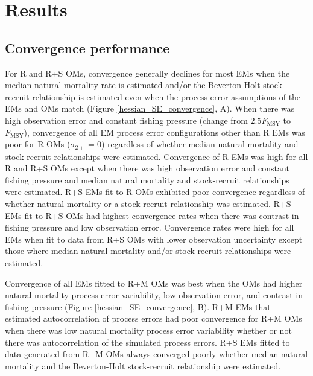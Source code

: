 \documentclass[
  12pt,
]{article}
\begin{document}
\hypertarget{results}{%
\section*{Results}\label{results}}

\hypertarget{convergence-performance}{%
\subsection*{Convergence performance}\label{convergence-performance}}

For R and R+S OMs, convergence generally declines for most EMs when the
median natural mortality rate is estimated and/or the Beverton-Holt
stock recruit relationship is estimated even when the process error
assumptions of the EMs and OMs match (Figure
\ref{hessian_SE_convergence}, A). When there was high observation error
and constant fishing pressure (change from \(2.5F_{\text{MSY}}\) to
\(F_{\text{MSY}}\)), convergence of all EM process error configurations
other than R EMs was poor for R OMs (\(\sigma_{2+} = 0\)) regardless of
whether median natural mortality and stock-recruit relationships were
estimated. Convergence of R EMs was high for all R and R+S OMs except
when there was high observation error and constant fishing pressure and
median natural mortality and stock-recruit relationships were estimated.
R+S EMs fit to R OMs exhibited poor convergence regardless of whether
natural mortality or a stock-recruit relationship was estimated. R+S EMs
fit to R+S OMs had highest convergence rates when there was contrast in
fishing pressure and low observation error. Convergence rates were high
for all EMs when fit to data from R+S OMs with lower observation
uncertainty except those where median natural mortality and/or
stock-recruit relationships were estimated.

Convergence of all EMs fitted to R+M OMs was best when the OMs had
higher natural mortality process error variability, low observation
error, and contrast in fishing pressure (Figure
\ref{hessian_SE_convergence}, B). R+M EMs that estimated autocorrelation
of process errors had poor convergence for R+M OMs when there was low
natural mortality process error variability whether or not there was
autocorrelation of the simulated process errors. R+S EMs fitted to data
generated from R+M OMs always converged poorly whether median natural
mortality and the Beverton-Holt stock-recruit relationship were
estimated.
\end{document}
